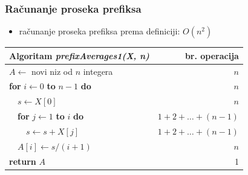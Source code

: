 \documentclass[compress]{beamer}
\begin{document}
\begin{frame}[fragile]
  \frametitle{Računanje proseka prefiksa}
  \begin{itemize}
    \item računanje proseka prefiksa prema definiciji: $O(n^2)$
  \end{itemize}
  \begin{center}
    \begin{tabular}{l|r}
      \textbf{Algoritam} \textit{prefixAverages1(X, n)} & \textbf{br. operacija} \\ \hline
      $A \leftarrow$ novi niz od $n$ integera & $n$ \\
      \textbf{for} $i \leftarrow 0$ \textbf{to} $n - 1$ \textbf{do} & $n$ \\
      \ \ $s \leftarrow X[0]$ & $n$ \\
      \ \ \textbf{for} $j \leftarrow 1$ \textbf{to} $i$ \textbf{do} & $1+2+\ldots+(n-1)$ \\
      \ \ \ \ $s \leftarrow s + X[j]$ & $1+2+\ldots+(n-1)$ \\
      \ \ $A[i] \leftarrow s/(i+1)$ & $n$ \\
      \textbf{return} $A$ & 1
    \end{tabular}
  \end{center}
\end{frame}
\end{document}
